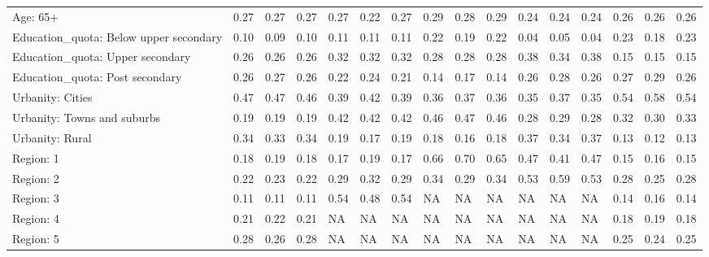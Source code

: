 \begin{tabular}[t]{llllllllllllllll}
Age: 65+ & 0.27 & 0.27 & 0.27 & 0.27 & 0.22 & 0.27 & 0.29 & 0.28 & 0.29 & 0.24 & 0.24 & 0.24 & 0.26 & 0.26 & 0.26\\
\addlinespace
Education\_quota: Below upper secondary & 0.10 & 0.09 & 0.10 & 0.11 & 0.11 & 0.11 & 0.22 & 0.19 & 0.22 & 0.04 & 0.05 & 0.04 & 0.23 & 0.18 & 0.23\\
Education\_quota: Upper secondary & 0.26 & 0.26 & 0.26 & 0.32 & 0.32 & 0.32 & 0.28 & 0.28 & 0.28 & 0.38 & 0.34 & 0.38 & 0.15 & 0.15 & 0.15\\
Education\_quota: Post secondary & 0.26 & 0.27 & 0.26 & 0.22 & 0.24 & 0.21 & 0.14 & 0.17 & 0.14 & 0.26 & 0.28 & 0.26 & 0.27 & 0.29 & 0.26\\
\addlinespace
Urbanity: Cities & 0.47 & 0.47 & 0.46 & 0.39 & 0.42 & 0.39 & 0.36 & 0.37 & 0.36 & 0.35 & 0.37 & 0.35 & 0.54 & 0.58 & 0.54\\
Urbanity: Towns and suburbs & 0.19 & 0.19 & 0.19 & 0.42 & 0.42 & 0.42 & 0.46 & 0.47 & 0.46 & 0.28 & 0.29 & 0.28 & 0.32 & 0.30 & 0.33\\
Urbanity: Rural & 0.34 & 0.33 & 0.34 & 0.19 & 0.17 & 0.19 & 0.18 & 0.16 & 0.18 & 0.37 & 0.34 & 0.37 & 0.13 & 0.12 & 0.13\\
\addlinespace
Region: 1 & 0.18 & 0.19 & 0.18 & 0.17 & 0.19 & 0.17 & 0.66 & 0.70 & 0.65 & 0.47 & 0.41 & 0.47 & 0.15 & 0.16 & 0.15\\
Region: 2 & 0.22 & 0.23 & 0.22 & 0.29 & 0.32 & 0.29 & 0.34 & 0.29 & 0.34 & 0.53 & 0.59 & 0.53 & 0.28 & 0.25 & 0.28\\
Region: 3 & 0.11 & 0.11 & 0.11 & 0.54 & 0.48 & 0.54 & NA & NA & NA & NA & NA & NA & 0.14 & 0.16 & 0.14\\
Region: 4 & 0.21 & 0.22 & 0.21 & NA & NA & NA & NA & NA & NA & NA & NA & NA & 0.18 & 0.19 & 0.18\\
Region: 5 & 0.28 & 0.26 & 0.28 & NA & NA & NA & NA & NA & NA & NA & NA & NA & 0.25 & 0.24 & 0.25\\
\bottomrule
\end{tabular}